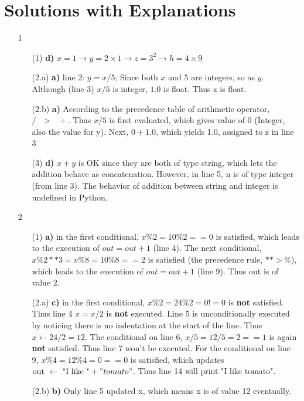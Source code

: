 \documentclass[11pt]{amsart}
\begin{document}
\section{Solutions with Explanations}
\begin{itemize}
\item [1] 
\begin{itemize}
\item [(1)] \textbf{d)} $x = 1 \to y = 2 \times {1} \to z = 3^{2} \to h = 4 \times 9$
\item [(2.a)] \textbf{a)} line 2: $y = x / 5$; Since both $x$ and $5$ are integers, so as $y$. Although (line 3) $x / 5$ is integer, $1.0$ is float. Thus z is float.
\item [(2.b)] \textbf{a)} According to the precedence table of arithmetic operator, $/\text{ }>\text{ }+$. Thus $x / 5$ is first evaluated, which gives value of 0 (Integer, also the value for y). Next, 
$0 + 1.0$, which yields 1.0, assigned to z in line 3
\item [(3)] \textbf{d)} $x+y$ is OK since they are both of type string, which lets the addition behave as concatenation. However, in line 5, n is of type integer (from line 3). The behavior of addition between 
string and integer is undefined in Python.
\end{itemize}


\item [2]
\begin{itemize}
\item [(1)] \textbf{a)} in the first conditional, $x \% 2 = 10 \% 2 == 0$ is satisfied, which leads to the execution of 
$out = out +1$ (line 4). The next conditional, $x \% 2 ** 3 = x \% 8 = 10 \% 8 == 2$ is satisfied (the precedence rule, $** > \%$), which leads to 
the execution of $out = out + 1$ (line 9). Thus out is of value $2$.
\item [(2.a)] \textbf{c)} in the first conditional, $ x \% 2 = 24 \% 2 = 0 != 0$ is \textbf{not} satisfied. Thus line 4 $x = x /2$ is \textbf{not} executed. Line 5 is unconditionally executed by noticing there is no indentation at the start of the line. 
Thus $ x \gets 24 / 2 = 12$. The conditional on line 6, $x / 5 = 12 / 5 = 2 == 1$ is again \textbf{not} satisfied. Thus line 7 won't be 
executed. For the conditional on line 9, $x \% 4 = 12 \% 4 = 0 == 0$ is satisfied, which updates  $\text{out } \gets \text{ "I like "} + {"tomato"}$. Thus line 14 will print "I like tomato".
\item [(2.b)] \textbf{b)} Only line 5 updated x, which means x is of value 12 eventually.
\end{itemize}


\end{itemize}
\end{document}
